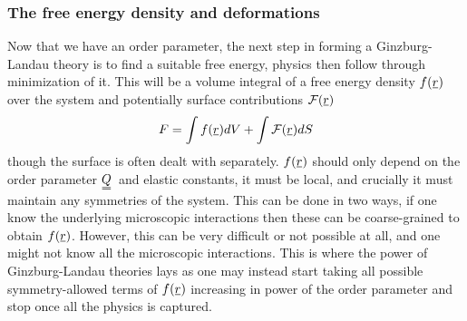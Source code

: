 \documentclass[12pt]{article}
\newcommand{\suf}[2]{\stackunder[0.5pt]{\stackunder[1pt]{\ensuremath{#1}}{\rule{\widthof{\ensuremath{#2}}*\real{0.9}}{.1ex}}}{}}
\newcommand{\duf}[2]{\stackunder[0.5pt]{\stackunder[0.8pt]{\stackunder[1pt]{\ensuremath{#1}}{\rule{\widthof{\ensuremath{#2}}*\real{0.9}}{.1ex}}}{\rule{\widthof{\ensuremath{#2}}*\real{0.9}}{.1ex}}}{}}
\newcommand{\su}[1]{\suf{#1}{#1}}
\newcommand{\du}[1]{\duf{#1}{#1}}
\newcommand{\QQ}{\ensuremath{\du{Q}}}
\begin{document}
        \subsubsection{The free energy density and deformations}\label{sec:intro_Q_F}
        Now that we have an order parameter, the next step in forming a Ginzburg-Landau theory is to find a suitable free energy, physics then follow through minimization of it.
        This will be a volume integral of a free energy density $f(\su{r})$ over the system and potentially surface contributions $\mathcal{F}(\su{r})$
        \begin{equation}
            F = \int f(\su{r}) dV + \int \mathcal{F}(\su{r}) dS
        \end{equation}
        though the surface is often dealt with separately.
        $f(\su{r})$ should only depend on the order parameter \QQ\ and elastic constants, it must be local, and crucially it must maintain any symmetries of the system\cite{kardarStatisticalPhysicsFields2007,reichlModernCourseStatistical2016}.
        This can be done in two ways, if one know the underlying microscopic interactions then these can be coarse-grained to obtain $f(\su{r})$.
        However, this can be very difficult or not possible at all, and one might not know all the microscopic interactions.
        This is where the power of Ginzburg-Landau theories lays as one may instead start taking all possible symmetry-allowed terms of $f(\su{r})$ increasing in power of the order parameter and stop once all the physics is captured.
\end{document}
